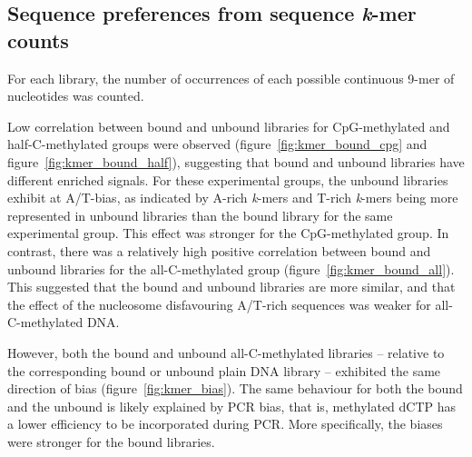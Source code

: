 \documentclass[parskip=full, numbers=noenddot]{scrbook}
\begin{document}
\subsection{Sequence preferences from sequence \emph{k}-mer counts}
\label{ssec:nuseqpref_kmer}

For each library, the number of occurrences of each possible continuous 9-mer of nucleotides was counted.

Low correlation between bound and unbound libraries for CpG-methylated and half-C-methylated groups were observed (figure~\ref{fig:kmer_bound_cpg} and figure~\ref{fig:kmer_bound_half}), suggesting that bound and unbound libraries have different enriched signals.  For these experimental groups, the unbound libraries exhibit at A/T-bias, as indicated by A-rich \emph{k}-mers and T-rich \emph{k}-mers being more represented in unbound libraries than the bound library for the same experimental group.  This effect was stronger for the CpG-methylated group.  In contrast, there was a relatively high positive correlation between bound and unbound libraries for the all-C-methylated group (figure~\ref{fig:kmer_bound_all}).  This suggested that the bound and unbound libraries are more similar, and that the effect of the nucleosome disfavouring A/T-rich sequences was weaker for all-C-methylated DNA.

However, both the bound and unbound all-C-methylated libraries -- relative to the corresponding bound or unbound plain DNA library -- exhibited the same direction of bias (figure~\ref{fig:kmer_bias}).  The same behaviour for both the bound and the unbound is likely explained by PCR bias, that is, methylated dCTP has a lower efficiency to be incorporated during PCR.  More specifically, the biases were stronger for the bound libraries.
\end{document}
